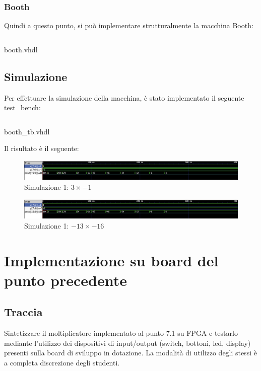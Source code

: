 \subsubsection{Booth}
Quindi a questo punto, si può implementare strutturalmente la macchina Booth:
 \begin{code}
    \inputminted[frame=lines, framesep=2mm, baselinestretch=1.2, bgcolor=LightGray, fontsize=\footnotesize, linenos]{vhdl}{vhdl_files/Esercizio_7_1/booth.vhdl}
    \caption{booth.vhdl}
    \label{lbl:booth}
\end{code}

\subsection{Simulazione}
Per effettuare la simulazione della macchina, è stato implementato il seguente test\_bench:
 \begin{code}
    \inputminted[frame=lines, framesep=2mm, baselinestretch=1.2, bgcolor=LightGray, fontsize=\footnotesize, linenos]{vhdl}{vhdl_files/Esercizio_7_1/booth_tb.vhdl}
    \caption{booth\_tb.vhdl}
    \label{lbl:tb_booth}
\end{code}

Il risultato è il seguente:

\begin{figure}[H]
	\centering
	\includegraphics[width=1\textwidth]{img/Esercizio_7_1/booth_sim_1.png}
	\caption{Simulazione 1: $3 \times -1$}
	\label{booth_sim_1} 
\end{figure}

\begin{figure}[H]
	\centering
	\includegraphics[width=1\textwidth]{img/Esercizio_7_1/booth_sim_1.png}
	\caption{Simulazione 1: $-13 \times -16$}
	\label{booth_sim_1} 
\end{figure}

\section{Implementazione su board del punto precedente}
\subsection{Traccia}
 Sintetizzare il moltiplicatore implementato al punto 7.1 su FPGA e testarlo mediante l’utilizzo dei dispositivi di input/output (switch, bottoni, led, display) presenti sulla board di sviluppo in dotazione. La modalità di utilizzo degli stessi è a completa discrezione degli 
studenti.
